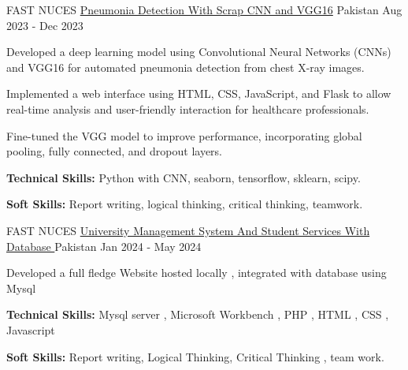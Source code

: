 \begin{cventries}
\cventry
    {FAST NUCES} %
    {\href{https://github.com/shafeenyousafzaii/Pneumonia_Detection_Team_Project}{Pneumonia Detection With Scrap CNN and VGG16} } %
    {Pakistan} %
    {Aug 2023 - Dec 2023} %
    {
      \begin{cvitems} %
        \item {Developed a deep learning model using Convolutional Neural Networks (CNNs) and VGG16 for automated pneumonia detection from chest X-ray images.}
        \item {Implemented a web interface using HTML, CSS, JavaScript, and Flask to allow real-time analysis and user-friendly interaction for healthcare professionals.}
        \item {Fine-tuned the VGG model to improve performance, incorporating global pooling, fully connected, and dropout layers.}
        \item {\textbf{Technical Skills:} Python with CNN, seaborn, tensorflow, sklearn, scipy.}
        \item {\textbf{Soft Skills:} Report writing, logical thinking, critical thinking, teamwork.}
      \end{cvitems}
    }

  \cventry
    {FAST NUCES} %
  {\href{https://github.com/shafeenyousafzaii/University-Management-System-And-Student-Services}{University Management System And Student Services With Database } } %
    {Pakistan} %
    {Jan 2024 - May 2024} %
    {
      \begin{cvitems} %
        \item {Developed a full fledge Website hosted locally , integrated with database using Mysql }
        \item {\textbf{Technical Skills:} Mysql server , Microsoft Workbench , PHP , HTML , CSS , Javascript}
        \item {\textbf{Soft Skills:} Report writing, Logical Thinking, Critical Thinking , team work.}
      \end{cvitems}
    }

\end{cventries}
